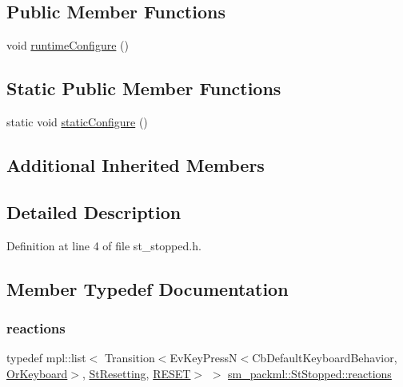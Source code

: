 \subsection*{Public Member Functions}
\begin{DoxyCompactItemize}
\item 
void \hyperlink{structsm__packml_1_1StStopped_ab528cd96bea69cd24c9f983b24a76613}{runtime\+Configure} ()
\end{DoxyCompactItemize}
\subsection*{Static Public Member Functions}
\begin{DoxyCompactItemize}
\item 
static void \hyperlink{structsm__packml_1_1StStopped_a84b427f80c9eb93589568de34c5d6817}{static\+Configure} ()
\end{DoxyCompactItemize}
\subsection*{Additional Inherited Members}


\subsection{Detailed Description}


Definition at line 4 of file st\+\_\+stopped.\+h.



\subsection{Member Typedef Documentation}
\mbox{\label{structsm__packml_1_1StStopped_a367bf88fe1a8e8b373732280733d1c02}} 
\subsubsection{\texorpdfstring{reactions}{reactions}}
{\footnotesize\ttfamily typedef mpl\+::list$<$ Transition$<$Ev\+Key\+PressN$<$Cb\+Default\+Keyboard\+Behavior, \hyperlink{classsm__packml_1_1OrKeyboard}{Or\+Keyboard}$>$, \hyperlink{structsm__packml_1_1StResetting}{St\+Resetting}, \hyperlink{structsm__packml_1_1StStopped_1_1RESET}{R\+E\+S\+ET}$>$ $>$ \hyperlink{structsm__packml_1_1StStopped_a367bf88fe1a8e8b373732280733d1c02}{sm\+\_\+packml\+::\+St\+Stopped\+::reactions}}



